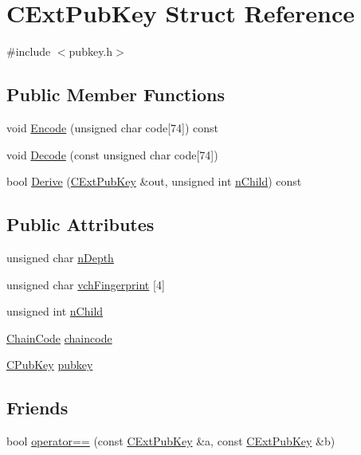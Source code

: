 \hypertarget{struct_c_ext_pub_key}{}\section{C\+Ext\+Pub\+Key Struct Reference}
\label{struct_c_ext_pub_key}


{\ttfamily \#include $<$pubkey.\+h$>$}

\subsection*{Public Member Functions}
\begin{DoxyCompactItemize}
\item 
void \mbox{\hyperlink{struct_c_ext_pub_key_a3a2ca2ede05e4b709e0a9a1bcee4de1e}{Encode}} (unsigned char code\mbox{[}74\mbox{]}) const
\item 
void \mbox{\hyperlink{struct_c_ext_pub_key_aa3ca44410ecfa765962d3b97aef61ab5}{Decode}} (const unsigned char code\mbox{[}74\mbox{]})
\item 
bool \mbox{\hyperlink{struct_c_ext_pub_key_a2dae8fcc00b9617589dd0b1444f95ec8}{Derive}} (\mbox{\hyperlink{struct_c_ext_pub_key}{C\+Ext\+Pub\+Key}} \&out, unsigned int \mbox{\hyperlink{struct_c_ext_pub_key_af816bc2798e9d9aaa94f56af4775d9bf}{n\+Child}}) const
\end{DoxyCompactItemize}
\subsection*{Public Attributes}
\begin{DoxyCompactItemize}
\item 
unsigned char \mbox{\hyperlink{struct_c_ext_pub_key_a58a0724855654eab688cdb00738e3dba}{n\+Depth}}
\item 
unsigned char \mbox{\hyperlink{struct_c_ext_pub_key_a57101a84d16d7897bcec224e488143d9}{vch\+Fingerprint}} \mbox{[}4\mbox{]}
\item 
unsigned int \mbox{\hyperlink{struct_c_ext_pub_key_af816bc2798e9d9aaa94f56af4775d9bf}{n\+Child}}
\item 
\mbox{\hyperlink{hash_8h_aa201a9867f780a040c7af908e0a85db3}{Chain\+Code}} \mbox{\hyperlink{struct_c_ext_pub_key_a2a61ccbe1bc8ddc0e5f7bf5972907760}{chaincode}}
\item 
\mbox{\hyperlink{class_c_pub_key}{C\+Pub\+Key}} \mbox{\hyperlink{struct_c_ext_pub_key_ab18c8520919d20bbfd068565ae566ea8}{pubkey}}
\end{DoxyCompactItemize}
\subsection*{Friends}
\begin{DoxyCompactItemize}
\item 
bool \mbox{\hyperlink{struct_c_ext_pub_key_a21fdc5351d6df62ce501f57bc1e1c9e6}{operator==}} (const \mbox{\hyperlink{struct_c_ext_pub_key}{C\+Ext\+Pub\+Key}} \&a, const \mbox{\hyperlink{struct_c_ext_pub_key}{C\+Ext\+Pub\+Key}} \&b)
\end{DoxyCompactItemize}


